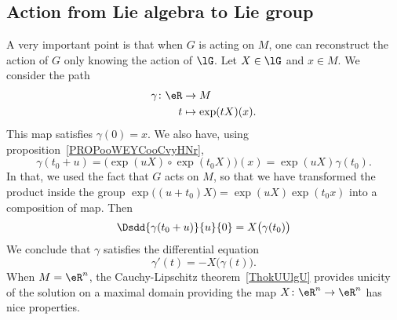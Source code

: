 \subsection{Action from Lie algebra to Lie group}

A very important point\cite{ooOLNIooDLmxkR} is that when \( G\) is acting on $M$, one can reconstruct the action of \( G\) only knowing the action of \( \lG\). Let \( X\in \lG\) and \( x\in M\). We consider the path
\begin{equation}
    \begin{aligned}
        \gamma\colon \eR&\to M \\
        t&\mapsto \exp(tX)(x).
    \end{aligned}
\end{equation}
This map satisfies \( \gamma(0)=x\). We also have, using proposition~\ref{PROPooWEYCooCvyHNr},
\begin{equation}
    \gamma(t_0+u)=\big( \exp(uX)\circ\exp(t_0X)\big)(x)=\exp(uX)\gamma(t_0).
\end{equation}
In that, we used the fact that \( G\) acts on \( M\), so that we have transformed the product inside the group \( \exp\big( (u+t_0)X \big)= \exp(uX)\exp(t_0x) \) into a composition of map.  Then
\begin{equation}
    \Dsdd{ \gamma(t_0+u) }{u}{0}=X\big( \gamma(t_0) \big)
\end{equation}
We conclude that \( \gamma\) satisfies the differential equation
\begin{equation}        \label{EQooFGSIooUplbmN}
    \gamma'(t)=-X\big( \gamma(t) \big).
\end{equation}
When \( M=\eR^n\), the Cauchy-Lipschitz theorem~\ref{ThokUUlgU} provides unicity of the solution on a maximal domain providing the map \( X\colon \eR^n\to \eR^n\) has nice properties.

